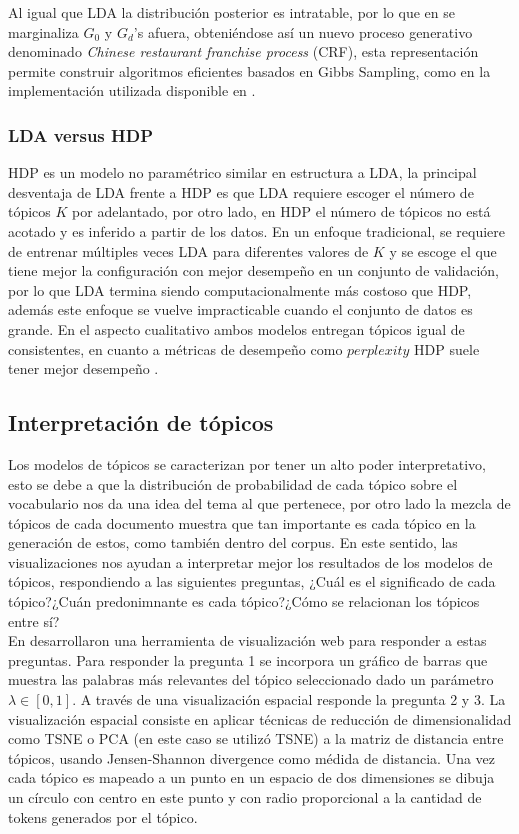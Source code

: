 \documentclass[letterpaper,12pt,oneside]{book} %
\begin{document}
Al igual que LDA la distribución posterior es intratable, por lo que en \citep{teh2005sharing} se marginaliza $G_{0}$ y $G_{d}$'s afuera, obteniéndose así un nuevo proceso generativo denominado \textit{Chinese restaurant franchise process} (CRF), esta representación permite construir algoritmos eficientes basados en Gibbs Sampling, como en la implementación utilizada disponible en \citep{HDP}.

\subsubsection{LDA versus HDP}
HDP es un modelo no paramétrico similar en estructura a LDA, la principal desventaja de LDA frente a HDP es que LDA requiere escoger el número de tópicos $K$ por adelantado, por otro lado, en HDP el número de tópicos no está acotado y es inferido a partir de los datos. En un enfoque tradicional, se requiere de entrenar múltiples veces LDA para diferentes valores de $K$ y se escoge el que tiene mejor la configuración con mejor desempeño en un conjunto de validación, por lo que LDA termina siendo computacionalmente más costoso que HDP, además este enfoque se vuelve impracticable cuando el conjunto de datos es grande. En el aspecto cualitativo ambos modelos entregan tópicos igual de consistentes, en cuanto a métricas de desempeño como $\textit{perplexity}$ HDP suele tener mejor desempeño \citep{teh2005sharing}.

\subsection{Interpretación de tópicos}
Los modelos de tópicos se caracterizan por tener un alto poder interpretativo, esto se debe a que la distribución de probabilidad de cada tópico sobre el vocabulario nos da una idea del tema al que pertenece, por otro lado la mezcla de tópicos de cada documento muestra que tan importante es cada tópico en la generación de estos, como también dentro del corpus. En este sentido, las visualizaciones nos ayudan a interpretar mejor los resultados de los modelos de tópicos, respondiendo a las siguientes preguntas, ¿Cuál es el significado de cada tópico?¿Cuán predonimnante es cada tópico?¿Cómo se relacionan los tópicos entre sí?\\

En \citep{sievert2014ldavis} desarrollaron una herramienta de visualización web para responder a estas preguntas. Para responder la pregunta 1 se incorpora un gráfico de barras que muestra las palabras más relevantes del tópico seleccionado dado un parámetro $\lambda \in [0,1]$. A través de una visualización espacial responde la pregunta 2 y 3. La visualización espacial consiste en aplicar técnicas de reducción de dimensionalidad como TSNE \citep{maaten2008visualizing} o PCA \citep{wold1987principal} (en este caso se utilizó TSNE) a la matriz de distancia entre tópicos, usando Jensen-Shannon divergence \citep{endres2003new} como médida de distancia. Una vez cada tópico es mapeado a un punto en un espacio de dos dimensiones se dibuja un círculo con centro en este punto y con radio proporcional a la cantidad de tokens generados por el tópico.\\
\end{document}
